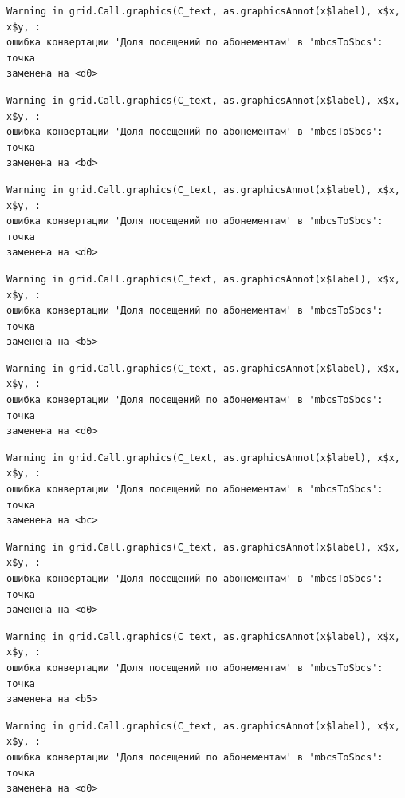 \documentclass[
  letterpaper,
  DIV=11,
  numbers=noendperiod]{scrreprt}
\begin{document}
\begin{verbatim}
Warning in grid.Call.graphics(C_text, as.graphicsAnnot(x$label), x$x, x$y, :
ошибка конвертации 'Доля посещений по абонементам' в 'mbcsToSbcs': точка
заменена на <d0>
\end{verbatim}

\begin{verbatim}
Warning in grid.Call.graphics(C_text, as.graphicsAnnot(x$label), x$x, x$y, :
ошибка конвертации 'Доля посещений по абонементам' в 'mbcsToSbcs': точка
заменена на <bd>
\end{verbatim}

\begin{verbatim}
Warning in grid.Call.graphics(C_text, as.graphicsAnnot(x$label), x$x, x$y, :
ошибка конвертации 'Доля посещений по абонементам' в 'mbcsToSbcs': точка
заменена на <d0>
\end{verbatim}

\begin{verbatim}
Warning in grid.Call.graphics(C_text, as.graphicsAnnot(x$label), x$x, x$y, :
ошибка конвертации 'Доля посещений по абонементам' в 'mbcsToSbcs': точка
заменена на <b5>
\end{verbatim}

\begin{verbatim}
Warning in grid.Call.graphics(C_text, as.graphicsAnnot(x$label), x$x, x$y, :
ошибка конвертации 'Доля посещений по абонементам' в 'mbcsToSbcs': точка
заменена на <d0>
\end{verbatim}

\begin{verbatim}
Warning in grid.Call.graphics(C_text, as.graphicsAnnot(x$label), x$x, x$y, :
ошибка конвертации 'Доля посещений по абонементам' в 'mbcsToSbcs': точка
заменена на <bc>
\end{verbatim}

\begin{verbatim}
Warning in grid.Call.graphics(C_text, as.graphicsAnnot(x$label), x$x, x$y, :
ошибка конвертации 'Доля посещений по абонементам' в 'mbcsToSbcs': точка
заменена на <d0>
\end{verbatim}

\begin{verbatim}
Warning in grid.Call.graphics(C_text, as.graphicsAnnot(x$label), x$x, x$y, :
ошибка конвертации 'Доля посещений по абонементам' в 'mbcsToSbcs': точка
заменена на <b5>
\end{verbatim}

\begin{verbatim}
Warning in grid.Call.graphics(C_text, as.graphicsAnnot(x$label), x$x, x$y, :
ошибка конвертации 'Доля посещений по абонементам' в 'mbcsToSbcs': точка
заменена на <d0>
\end{verbatim}
\end{document}
